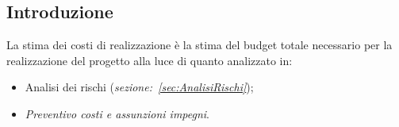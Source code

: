 \subsection{Introduzione}
La stima dei costi di realizzazione è la stima del budget totale necessario per la realizzazione del progetto alla luce di quanto analizzato in: 
\begin{itemize}
    \item Analisi dei rischi (\textit{sezione:~\ref{sec:AnalisiRischi}});
    \item \textit{Preventivo costi e assunzioni impegni}.
\end{itemize}
